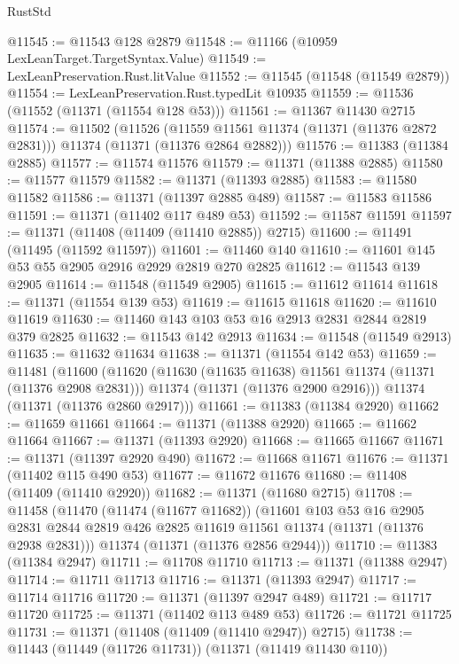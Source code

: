 \begin{lexlean}{RustStd}
\begin{coremodule}
{\begin{coremodule}
{{{{{{{{{{{{{{{{{{{{{{{{{{{{{{{{{@11545 := @11543 @128 @2879
@11548 := @11166 (@10959 LexLeanTarget.TargetSyntax.Value)
@11549 := LexLeanPreservation.Rust.litValue
@11552 := @11545 (@11548 (@11549 @2879))
@11554 := LexLeanPreservation.Rust.typedLit @10935
@11559 := @11536 (@11552 (@11371 (@11554 @128 @53)))
@11561 := @11367 @11430 @2715
@11574 := @11502
    (@11526
      (@11559 @11561 @11374 (@11371 (@11376 @2872 @2831)))
      @11374
      (@11371 (@11376 @2864 @2882)))
@11576 := @11383 (@11384 @2885)
@11577 := @11574 @11576
@11579 := @11371 (@11388 @2885)
@11580 := @11577 @11579
@11582 := @11371 (@11393 @2885)
@11583 := @11580 @11582
@11586 := @11371 (@11397 @2885 @489)
@11587 := @11583 @11586
@11591 := @11371 (@11402 @117 @489 @53)
@11592 := @11587 @11591
@11597 := @11371 (@11408 (@11409 (@11410 @2885)) @2715)
@11600 := @11491 (@11495 (@11592 @11597))
@11601 := @11460 @140
@11610 := @11601 @145 @53 @55 @2905 @2916 @2929 @2819 @270 @2825
@11612 := @11543 @139 @2905
@11614 := @11548 (@11549 @2905)
@11615 := @11612 @11614
@11618 := @11371 (@11554 @139 @53)
@11619 := @11615 @11618
@11620 := @11610 @11619
@11630 := @11460 @143 @103 @53 @16 @2913 @2831 @2844 @2819 @379 @2825
@11632 := @11543 @142 @2913
@11634 := @11548 (@11549 @2913)
@11635 := @11632 @11634
@11638 := @11371 (@11554 @142 @53)
@11659 := @11481
    (@11600
      (@11620
        (@11630 (@11635 @11638) @11561 @11374 (@11371 (@11376 @2908 @2831)))
        @11374
        (@11371 (@11376 @2900 @2916)))
      @11374
      (@11371 (@11376 @2860 @2917)))
@11661 := @11383 (@11384 @2920)
@11662 := @11659 @11661
@11664 := @11371 (@11388 @2920)
@11665 := @11662 @11664
@11667 := @11371 (@11393 @2920)
@11668 := @11665 @11667
@11671 := @11371 (@11397 @2920 @490)
@11672 := @11668 @11671
@11676 := @11371 (@11402 @115 @490 @53)
@11677 := @11672 @11676
@11680 := @11408 (@11409 (@11410 @2920))
@11682 := @11371 (@11680 @2715)
@11708 := @11458
    (@11470
      (@11474 (@11677 @11682))
      (@11601
        @103
        @53
        @16
        @2905
        @2831
        @2844
        @2819
        @426
        @2825
        @11619
        @11561
        @11374
        (@11371 (@11376 @2938 @2831)))
      @11374
      (@11371 (@11376 @2856 @2944)))
@11710 := @11383 (@11384 @2947)
@11711 := @11708 @11710
@11713 := @11371 (@11388 @2947)
@11714 := @11711 @11713
@11716 := @11371 (@11393 @2947)
@11717 := @11714 @11716
@11720 := @11371 (@11397 @2947 @489)
@11721 := @11717 @11720
@11725 := @11371 (@11402 @113 @489 @53)
@11726 := @11721 @11725
@11731 := @11371 (@11408 (@11409 (@11410 @2947)) @2715)
@11738 := @11443 (@11449 (@11726 @11731)) (@11371 (@11419 @11430 @110))
}}}}}}}}}}}}}}}}}}}}}}}}}}}}}}}}}
\end{coremodule}}
\end{coremodule}
\end{lexlean}
